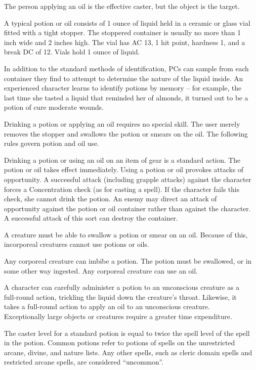 The person applying an oil is the effective caster, but the object is the target.

 A typical potion or oil consists of 1 ounce of liquid held in a ceramic or glass vial fitted with a tight stopper. The stoppered container is usually no more than 1 inch wide and 2 inches high. The vial has AC 13, 1 hit point, hardness 1, and a break DC of 12. Vials hold 1 ounce of liquid.

 In addition to the standard methods of identification, PCs can sample from each container they find to attempt to determine the nature of the liquid inside. An experienced character learns to identify potions by memory -- for example, the last time she tasted a liquid that reminded her of almonds, it turned out to be a potion of cure moderate wounds.

 Drinking a potion or applying an oil requires no special skill. The user merely removes the stopper and swallows the potion or smears on the oil. The following rules govern potion and oil use.

Drinking a potion or using an oil on an item of gear is a standard action. The potion or oil takes effect immediately. Using a potion or oil provokes attacks of opportunity. A successful attack (including grapple attacks) against the character forces a Concentration check (as for casting a spell). If the character fails this check, she cannot drink the potion. An enemy may direct an attack of opportunity against the potion or oil container rather than against the character. A successful attack of this sort can destroy the container.

A creature must be able to swallow a potion or smear on an oil. Because of this, incorporeal creatures cannot use potions or oils.

Any corporeal creature can imbibe a potion. The potion must be swallowed, or in some other way ingested. Any corporeal creature can use an oil.

A character can carefully administer a potion to an unconscious creature as a full-round action, trickling the liquid down the creature's throat. Likewise, it takes a full-round action to apply an oil to an unconscious creature. Exceptionally large objects or creatures require a greater time expenditure.

 The caster level for a standard potion is equal to twice the spell level of the spell in the potion. Common potions refer to potions of spells on the unrestricted arcane, divine, and nature lists. Any other spells, such as cleric domain spells and restricted arcane spells, are considered ``uncommon''.

